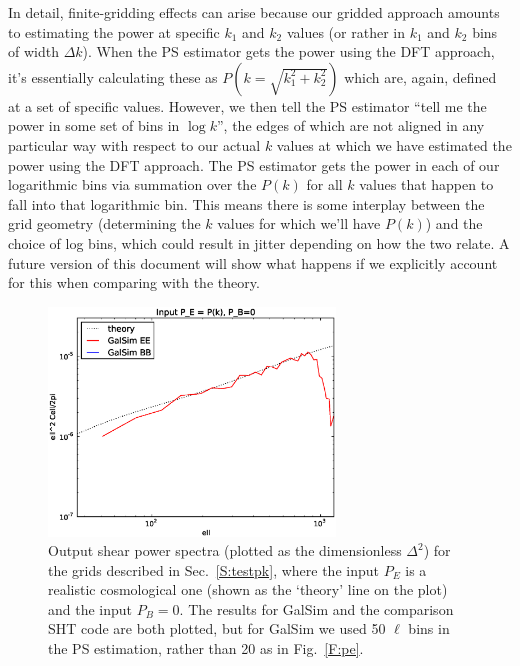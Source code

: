 \documentclass[preprint]{aastex}
\begin{document}
In detail, finite-gridding effects can arise because our gridded
approach amounts to estimating the power at specific $k_1$ and $k_2$
values (or rather in $k_1$ and $k_2$ bins of width $\Delta k$).  When
the PS estimator gets the power using the DFT approach, it's
essentially calculating these as $P(k=\sqrt{k_1^2 +k_2^2})$ which are,
again, defined at a set of specific values.  However, we then tell the
PS estimator ``tell me the power in some set of bins in $\log{k}$'', the
edges of which are not aligned in any particular way with respect to
our actual $k$ values at which we have estimated the power using the DFT
approach.  The PS estimator gets the power in each of our logarithmic
bins via summation over the $P(k)$ for all $k$ values that happen to fall
into that logarithmic bin.  This means there is some interplay between
the grid geometry (determining the $k$ values for which we'll have $P(k)$)
and the choice of log bins, which could result in jitter depending on
how the two relate.  A future version of this document will show what
happens if we explicitly account for this when comparing with the
theory.
\begin{figure}
\begin{center}
\includegraphics[width=3in]{../external/test_gridshear/output/compare_input_pe.fine.eps}
\caption{Output shear power spectra (plotted as the dimensionless
  $\Delta^2$) for the grids described in Sec.~\ref{S:testpk}, where
  the input $P_E$ is a realistic cosmological one (shown as the `theory' line on
  the plot) and the input $P_B=0$. The results for GalSim and the
  comparison SHT code are both plotted, but for GalSim we used 50
  $\ell$ bins in the PS estimation, rather than 20 as in Fig.~\ref{F:pe}.\label{F:pe-fine}}
\end{center}
\end{figure}
\end{document}
